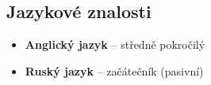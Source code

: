 \subsection{Jazykové znalosti}
\begin{itemize}
  \item \textbf{Anglický jazyk} -- středně pokročilý
  \item \textbf{Ruský jazyk} -- začátečník (pasivní)
\end{itemize}
